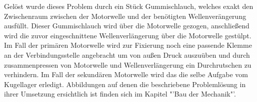 \begin{itemize}
Gelöst wurde dieses Problem durch ein Stück Gummischlauch, welches exakt den Zwischenraum zwischen der Motorwelle und der benötigten Wellenverängerung ausfüllt. Dieser Gummischlauch wird über die Motorwelle gezogen, anschließend wird die zuvor eingeschnittene Wellenverlängerung über die Motorwelle gestülpt. Im Fall der primären Motorwelle wird zur Fixierung noch eine passende Klemme an der Verbindungsstelle angebracht um von außen Druck auszuüben und durch zusammenpressen von Motorwelle und Wellenverlängerung ein Durchrutschen zu verhindern. Im Fall der sekundären Motorwelle wird das die selbe Aufgabe vom Kugellager erledigt. Abbildungen auf denen die beschriebene Problemlösung in ihrer Umsetzung ersichtlich ist finden sich im Kapitel "'Bau der Mechanik"'.
\end{itemize}